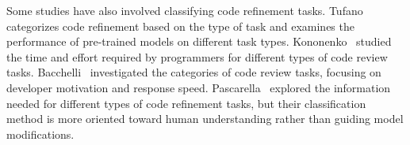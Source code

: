 Some studies have also involved classifying code refinement tasks.
Tufano~\cite{tufano2024code} categorizes code refinement based on the type of task and examines the performance of pre-trained models on different task types. 
Kononenko~\cite{kononenko2016code} studied the time and effort required by programmers for different types of code review tasks. Bacchelli~\cite{bacchelli2013expectations} investigated the categories of code review tasks, focusing on developer motivation and response speed. Pascarella~\cite{pascarella2018information} explored the information needed for different types of code refinement tasks, but their classification method is more oriented toward human understanding rather than guiding model modifications.




